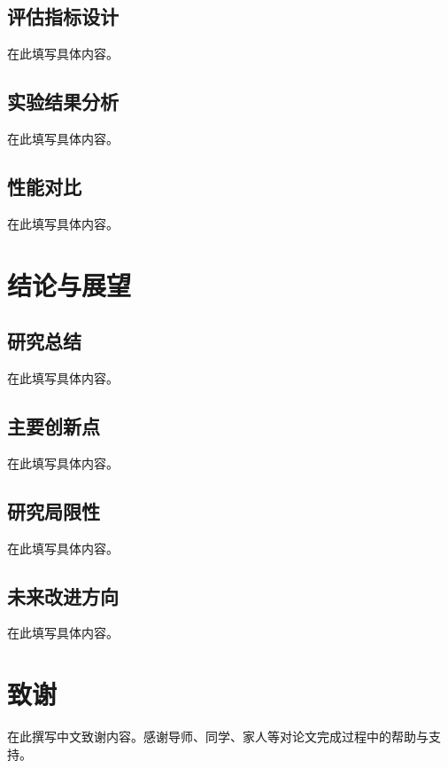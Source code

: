 \documentclass[a4paper,12pt,openright]{ctexrep}
\begin{document}
\section{评估指标设计}
在此填写具体内容。

\section{实验结果分析}
在此填写具体内容。

\section{性能对比}
在此填写具体内容。


\chapter{结论与展望}
\section{研究总结}
在此填写具体内容。

\section{主要创新点}
在此填写具体内容。

\section{研究局限性}
在此填写具体内容。

\section{未来改进方向}
在此填写具体内容。






\chapter*{致\quad 谢}

在此撰写中文致谢内容。感谢导师、同学、家人等对论文完成过程中的帮助与支持。
\end{document}
